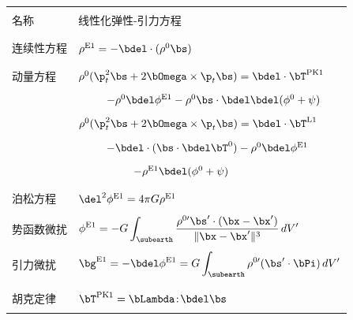\begin{table}
\label{table3.2}
\centering
\begin{tabular}{|l|l|} \hline
& \\
名称 & 线性化弹性-引力方程\\
& \\ \hline
& \\
\index{continuity equation}%
连续性方程 & $\rho^{\rm E1}=-\bdel\cdot(\rho^0\bs)$ \\
& \\ \hline
& \\
\index{momentum equation}%
动量方程
& $\rho^0(\p_t^2\bs+2\bOmega\times\p_t\bs)=\bdel\cdot\bT^{\rm PK1}$ \\
\vspace{-1.6 mm} & \vspace{-1.6 mm} \\
& $\qquad\,\,\,-\rho^0\bdel\phi^{\rm E1}-\rho^0\bs\cdot\bdel\bdel(\phi^0+\psi)$ \\
& \\
& $\rho^0(\p_t^2\bs+2\bOmega\times\p_t\bs)=
\bdel\cdot\bT^{\rm L1}$ \\
\vspace{-1.6 mm} & \vspace{-1.6 mm} \\
& $\qquad\,\,\,-\bdel\cdot(\bs\cdot\bdel\bT^0)-\rho^0\bdel\phi^{\rm E1}$ \\
\vspace{-1.6 mm} & \vspace{-1.6 mm} \\
& $\qquad\qquad\,\,\,\,\,\,-\rho^{\rm E1}\bdel(\phi^0+\psi)$ \\
& \\ \hline
& \\
\index{Poisson's equation}%
泊松方程
& $\del^2\phi^{\rm E1}=4\pi G\rho^{\rm E1}$ \\
& \\
势函数微扰
& $\displaystyle{\phi^{\rm E1}=
-G\int_{\subearth}\frac{\rho^{0\prime}\bs'\cdot
(\bx-\bx')}{\|\bx-\bx'\|^3}\,dV'}$ \\
& \\
引力微扰
& $\displaystyle{\bg^{\rm E1}=-\bdel\phi^{\rm E1}=
G\int_{\subearth}\rho^{0\prime}(\bs'\cdot\bPi)\,dV'}$ \\
& \\ \hline
& \\
\index{Hooke's law}%
胡克定律
& $\bT^{\rm PK1}=\bLambda\!:\!\bdel\bs$ \\
\vspace{-2.0 mm} & \vspace{-2.0 mm} \\

\end{tabular}
\end{table}
